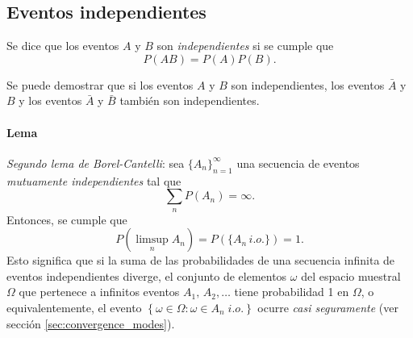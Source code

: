 \documentclass[a4paper]{report}
\begin{document}
\subsection{Eventos independientes}\label{sec:independents_events}

Se dice que los eventos \(A\) y \(B\) son \emph{independientes} si se cumple que
\begin{equation}\label{eq:independent_events_definition}
 P(AB)=P(A)P(B).
\end{equation}

Se puede demostrar que si los eventos \(A\) y \(B\) son independientes, los eventos \(\bar{A}\) y \(B\) y los eventos \(\bar{A}\) y \(\bar{B}\) también son independientes.

\paragraph{Lema} \emph{Segundo lema de Borel-Cantelli}: sea \(\{A_n\}_{n=1}^{\infty}\) una secuencia de eventos \emph{mutuamente independientes} tal que
\[
 \sum_n P(A_n)=\infty.
\]
Entonces, se cumple que
\[
  P\left(\limsup_n A_n\right) = P(\{A_n\,i.o.\})=1.
\]
Esto significa que si la suma de las probabilidades de una secuencia infinita de eventos independientes diverge, el conjunto de elementos \(\omega\) del espacio muestral \(\Omega\) que pertenece a infinitos eventos \(A_1,\,A_2,\dots\) tiene probabilidad 1 en \(\Omega\), o equivalentemente, el evento \(\left\{\omega\in\Omega:\omega\in A_n\;i.o.\right\}\) ocurre \emph{casi seguramente} (ver sección \ref{sec:convergence_modes}).
\end{document}

